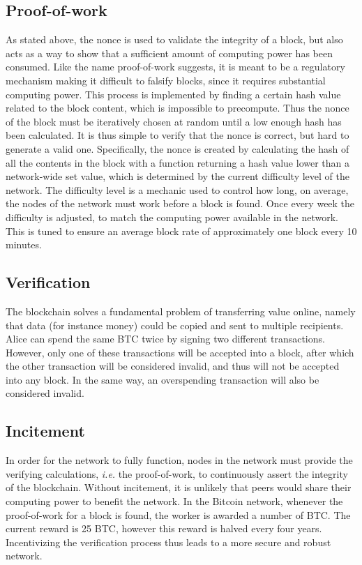 \subsection{Proof-of-work}
As stated above, the nonce is used to validate the integrity of a block, but also acts as a way to show that a sufficient amount of computing power has been consumed. Like the name proof-of-work suggests, it is meant to be a regulatory mechanism making it difficult to falsify blocks, since it requires substantial computing power. This process is implemented by finding a certain hash value related to the block content, which is impossible to precompute. Thus the nonce of the block must be iteratively chosen at random until a low enough hash has been calculated. It is thus simple to verify that the nonce is correct, but hard to generate a valid one. Specifically, the nonce is created by calculating the hash of all the contents in the block with a function returning a hash value lower than a network-wide set value, which is determined by the current difficulty level of the network. The difficulty level is a mechanic used to control how long, on average, the nodes of the network must work before a block is found. Once every week the difficulty is adjusted, to match the computing power available in the network. This is tuned to ensure an average block rate of approximately one block every 10 minutes. 

\subsection{Verification}
The blockchain solves a fundamental problem of transferring value online, namely that data (for instance money) could be copied and sent to multiple recipients. Alice can spend the same BTC twice by signing two different transactions. However, only one of these transactions will be accepted into a block, after which the other transaction will be considered invalid, and thus will not be accepted into any block. In the same way, an overspending transaction will also be considered invalid.

\subsection{Incitement}
In order for the network to fully function, nodes in the network must provide the verifying calculations, \textit{i.e.} the proof-of-work, to continuously assert the integrity of the blockchain. Without incitement, it is unlikely that peers would share their computing power to benefit the network. In the Bitcoin network, whenever the proof-of-work for a block is found, the worker is awarded a number of BTC. The current reward is 25 BTC, however this reward is halved every four years. Incentivizing the verification process thus leads to a more secure and robust network.

